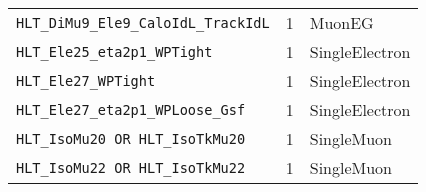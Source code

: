 \begin{table}[h]
\begin{tabular}{|lcl|}
            \texttt{HLT\_DiMu9\_Ele9\_CaloIdL\_TrackIdL} &  1 &   MuonEG \\
            \texttt{HLT\_Ele25\_eta2p1\_WPTight} &     1 &   SingleElectron \\
            \texttt{HLT\_Ele27\_WPTight} &    1 &   SingleElectron \\
            \texttt{HLT\_Ele27\_eta2p1\_WPLoose\_Gsf} &     1 &   SingleElectron \\
            \texttt{HLT\_IsoMu20 OR HLT\_IsoTkMu20} &    1 &   SingleMuon \\
            \texttt{HLT\_IsoMu22 OR HLT\_IsoTkMu22} &    1 &   SingleMuon \\
        \hline
		\end{tabular}
	\label{table:dilep_2016_trig}
\end{table}
